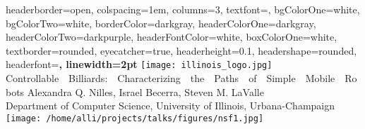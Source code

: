 \documentclass[landscape,a0paper,fontscale=0.3]{baposter} %
\begin{document}
\begin{poster}
{
headerborder=open, %
colspacing=1em, %
columns=3,
textfont=\Large,
bgColorOne=white, %
bgColorTwo=white, %
borderColor=darkgray, %
headerColorOne=darkgray, %
headerColorTwo=darkpurple, %
headerFontColor=white, %
boxColorOne=white, %
textborder=rounded, %
eyecatcher=true, %
headerheight=0.1\textheight, %
headershape=rounded, %
headerfont=\Large\bf\textsc, %
linewidth=2pt %
}
%
{\texttt{[image: illinois\_logo.jpg]}} %
{{Controllable~~Billiards:~~Characterizing~~the~~Paths~~of~~Simple~~Mobile~~Robots}\vspace{-0.0em}} %
{Alexandra Q. Nilles, Israel Becerra, Steven M. LaValle  \hspace{15pt}\\ Department of Computer Science, University of Illinois, Urbana-Champaign} %
{\texttt{[image: /home/alli/projects/talks/figures/nsf1.jpg]}} %



\end{poster}
\end{document}
